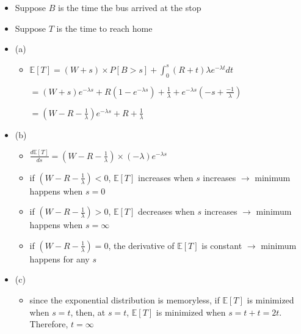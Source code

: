 \documentclass[a4paper]{article}
\begin{document}
\section{}
\begin{itemize}
\begin{figure} [H]
    \texttt{[image: question/3.png]}
\end{figure}
    \item Suppose $B$ is the time the bus arrived at the stop
    \item Suppose $T$ is the time to reach home
    \item (a)
        \begin{itemize}
            \item $\mathbb{E}[T] = (W + s)\times P[B > s] + \int_0^s (R+t) \lambda e^{-\lambda t} dt$

                $= (W + s)e^{-\lambda s} + R (1 - e^{-\lambda s}) + \frac{1}{\lambda} + e^{-\lambda s} (-s + \frac{-1}{\lambda})$

                $= (W - R - \frac{1}{\lambda}) e^{-\lambda s} + R + \frac{1}{\lambda}$
        \end{itemize}
    \item (b)
        \begin{itemize}
            \item $\frac{d \mathbb{E}[T]}{ds} = (W - R - \frac{1}{\lambda}) \times (-\lambda)e^{-\lambda s}$
            \item if $(W - R - \frac{1}{\lambda}) < 0$, $\mathbb{E}[T]$ increases when $s$ increases $\rightarrow$ minimum happens when $s=0$
            \item if $(W - R - \frac{1}{\lambda}) > 0$, $\mathbb{E}[T]$ decreases when $s$ increases $\rightarrow$ minimum happens when $s=\infty$
            \item if $(W - R - \frac{1}{\lambda}) = 0$, the derivative of $\mathbb{E}[T]$ is constant $\rightarrow$ minimum happens for any $s$
        \end{itemize}
    \item (c)
        \begin{itemize}
            \item since the exponential distribution is memoryless, if $\mathbb{E}[T]$ is minimized when $s = t$, then, at $s=t$, $\mathbb{E}[T]$ is minimized when $s = t + t = 2t$. Therefore, $t = \infty$
        \end{itemize}
\end{itemize}
\end{document}
